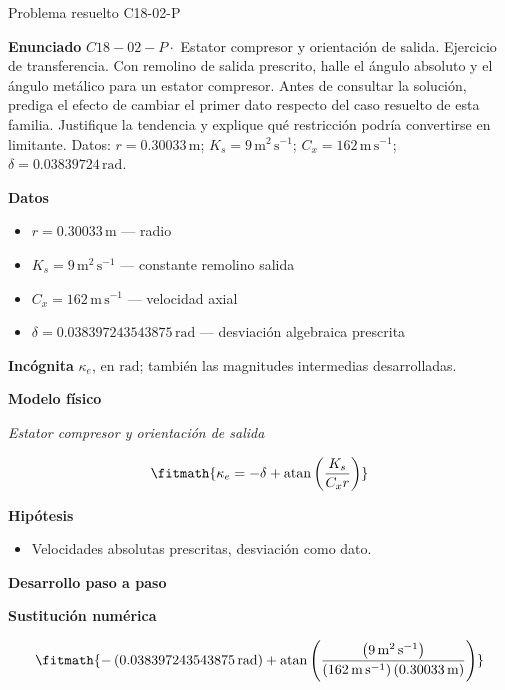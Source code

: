 \documentclass[10pt,openany]{book}
\begin{document}
\begin{studiumworked}{Problema resuelto C18-02-P}


\noindent\textbf{Enunciado}
\(C18-02-P \cdot\) Estator compresor y orientación de salida. Ejercicio de transferencia. Con remolino de salida prescrito, halle el ángulo absoluto y el ángulo metálico para un estator compresor. Antes de consultar la solución, prediga el efecto de cambiar el primer dato respecto del caso resuelto de esta familia. Justifique la tendencia y explique qué restricción podría convertirse en limitante. Datos: \(r=0.30033\, \mathrm{m}\); \(K_s=9\, \mathrm{m}^{2}\,\mathrm{s}^{-1}\); \(C_x=162\, \mathrm{m}\,\mathrm{s}^{-1}\); \(\delta=0.03839724\, \mathrm{rad}\).

\noindent\textbf{Datos}
\begin{itemize}
\item $r = 0.30033\,\mathrm{m}$ — radio
\item $K_s = 9\,\mathrm{m}^{2}\,\mathrm{s}^{-1}$ — constante remolino salida
\item $C_x = 162\,\mathrm{m}\,\mathrm{s}^{-1}$ — velocidad axial
\item $\delta = 0.038397243543875\,\mathrm{rad}$ — desviación algebraica prescrita
\end{itemize}

\noindent\textbf{Incógnita}
$\kappa_e$, en $\mathrm{rad}$; también las magnitudes intermedias desarrolladas.

\noindent\textbf{Modelo físico}

\noindent\textit{Estator compresor y orientación de salida}

\[
\fitmath{\kappa_e=- \delta + \operatorname{atan}{\left(\frac{K_s}{C_x r} \right)}}
\]

\noindent\textbf{Hipótesis}
\begin{itemize}
\item Velocidades absolutas prescritas, desviación como dato.
\end{itemize}

\noindent\textbf{Desarrollo paso a paso}



\noindent\textbf{Sustitución numérica}

\[
\fitmath{- \left(0.038397243543875\,\mathrm{rad}\right) + \operatorname{atan}{\left(\frac{\left(9\,\mathrm{m}^{2}\,\mathrm{s}^{-1}\right)}{\left(162\,\mathrm{m}\,\mathrm{s}^{-1}\right) \left(0.30033\,\mathrm{m}\right)} \right)}}
\]


\end{studiumworked}
\end{document}
